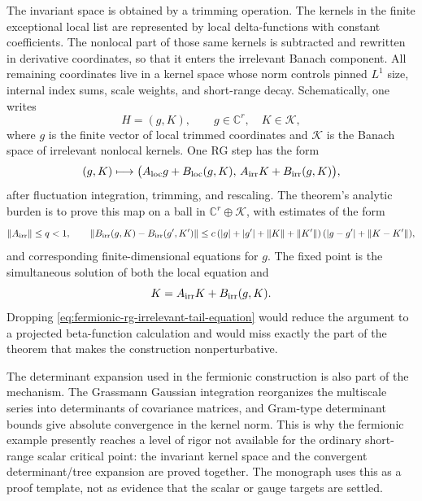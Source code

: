 The invariant space is obtained by a trimming operation.  The kernels in the
finite exceptional local list are represented by local delta-functions with
constant coefficients.  The nonlocal part of those same kernels is subtracted
and rewritten in derivative coordinates, so that it enters the irrelevant
Banach component.  All remaining coordinates live in a kernel space whose norm
controls pinned \(L^1\) size, internal index sums, scale weights, and
short-range decay.  Schematically, one writes
\[
  H=(g,K),
  \qquad
  g\in\mathbb C^r,\quad K\in\mathcal K,
\]
where \(g\) is the finite vector of local trimmed coordinates and
\(\mathcal K\) is the Banach space of irrelevant nonlocal kernels.  One RG step
has the form
\begin{equation}
  (g,K)\longmapsto
  \bigl(A_{\rm loc}g+B_{\rm loc}(g,K),\,
        A_{\rm irr}K+B_{\rm irr}(g,K)\bigr),
  \label{eq:fermionic-rg-trimmed-coordinate-map}
\end{equation}
after fluctuation integration, trimming, and rescaling.  The theorem's
analytic burden is to prove this map on a ball in
\(\mathbb C^r\oplus\mathcal K\), with estimates of the form
\begin{equation}
  \|A_{\rm irr}\|\leq q<1,
  \qquad
  \|B_{\rm irr}(g,K)-B_{\rm irr}(g',K')\|
  \leq
  c\,(|g|+|g'|+\|K\|+\|K'\|)\,
  (|g-g'|+\|K-K'\|),
  \label{eq:fermionic-rg-irrelevant-contraction-form}
\end{equation}
and corresponding finite-dimensional equations for \(g\).  The fixed point is
the simultaneous solution of both the local equation and
\begin{equation}
  K=A_{\rm irr}K+B_{\rm irr}(g,K).
  \label{eq:fermionic-rg-irrelevant-tail-equation}
\end{equation}
Dropping \eqref{eq:fermionic-rg-irrelevant-tail-equation} would reduce the
argument to a projected beta-function calculation and would miss exactly the
part of the theorem that makes the construction nonperturbative.

The determinant expansion used in the fermionic construction is also part of
the mechanism.  The Grassmann Gaussian integration reorganizes the multiscale
series into determinants of covariance matrices, and Gram-type determinant
bounds give absolute convergence in the kernel norm.  This is why the
fermionic example presently reaches a level of rigor not available for the
ordinary short-range scalar critical point: the invariant kernel space and the
convergent determinant/tree expansion are proved together.  The monograph uses
this as a proof template, not as evidence that the scalar or gauge targets are
settled.

